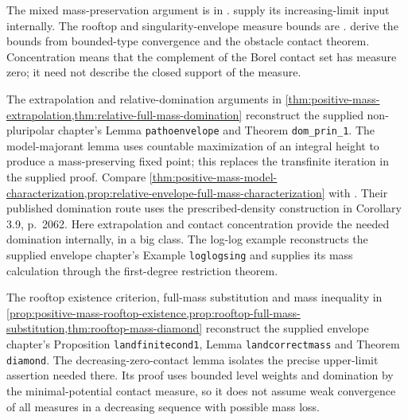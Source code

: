 The mixed mass-preservation argument is in \cite[Section 3B, p.~2060]{DDNL18mono}.  supply its increasing-limit input internally. The rooftop and singularity-envelope measure bounds are \cite[Lemma 3.7 and Theorem 3.8, pp.~2060--2061]{DDNL18mono}.  derive the bounds from bounded-type convergence and the obstacle contact theorem. Concentration means that the complement of the Borel contact set has measure zero; it need not describe the closed support of the measure.

The extrapolation and relative-domination arguments in \cref{thm:positive-mass-extrapolation,thm:relative-full-mass-domination} reconstruct the supplied non-pluripolar chapter's Lemma \texttt{pathoenvelope} and Theorem \texttt{dom\_prin\_1}. The model-majorant lemma uses countable maximization of an integral height to produce a mass-preserving fixed point; this replaces the transfinite iteration in the supplied proof. Compare \cref{thm:positive-mass-model-characterization,prop:relative-envelope-full-mass-characterization} with \cite[Theorems 3.12 and 3.14, pp.~2063--2064]{DDNL18mono}. Their published domination route uses the prescribed-density construction in Corollary 3.9, p.~2062. Here extrapolation and contact concentration provide the needed domination internally, in a big class. The log-log example reconstructs the supplied envelope chapter's Example \texttt{loglogsing} and supplies its mass calculation through the first-degree restriction theorem.

The rooftop existence criterion, full-mass substitution and mass inequality in \cref{prop:positive-mass-rooftop-existence,prop:rooftop-full-mass-substitution,thm:rooftop-mass-diamond} reconstruct the supplied envelope chapter's Proposition \texttt{landfinitecond1}, Lemma \texttt{landcorrectmass} and Theorem \texttt{diamond}. The decreasing-zero-contact lemma isolates the precise upper-limit assertion needed there. Its proof uses bounded level weights and domination by the minimal-potential contact measure, so it does not assume weak convergence of all measures in a decreasing sequence with possible mass loss.

